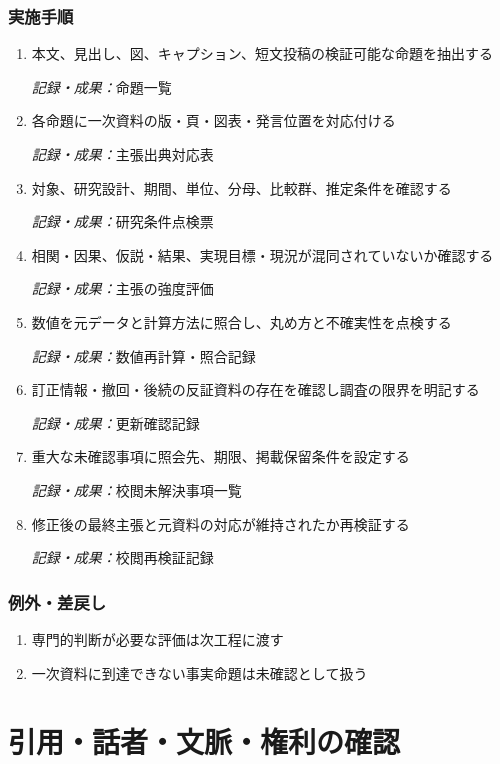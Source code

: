 \documentclass[a4paper,11pt]{article}
\begin{document}
\subsubsection*{実施手順}
\begin{enumerate}[leftmargin=2em,itemsep=0.65em]
\item 本文、見出し、図、キャプション、短文投稿の検証可能な命題を抽出する\par\noindent\textit{記録・成果：}命題一覧\nobreak\smallskip
\item 各命題に一次資料の版・頁・図表・発言位置を対応付ける\par\noindent\textit{記録・成果：}主張出典対応表\nobreak\smallskip
\item 対象、研究設計、期間、単位、分母、比較群、推定条件を確認する\par\noindent\textit{記録・成果：}研究条件点検票\nobreak\smallskip
\item 相関・因果、仮説・結果、実現目標・現況が混同されていないか確認する\par\noindent\textit{記録・成果：}主張の強度評価\nobreak\smallskip
\item 数値を元データと計算方法に照合し、丸め方と不確実性を点検する\par\noindent\textit{記録・成果：}数値再計算・照合記録\nobreak\smallskip
\item 訂正情報・撤回・後続の反証資料の存在を確認し調査の限界を明記する\par\noindent\textit{記録・成果：}更新確認記録\nobreak\smallskip
\item 重大な未確認事項に照会先、期限、掲載保留条件を設定する\par\noindent\textit{記録・成果：}校閲未解決事項一覧\nobreak\smallskip
\item 修正後の最終主張と元資料の対応が維持されたか再検証する\par\noindent\textit{記録・成果：}校閲再検証記録\nobreak\smallskip
\end{enumerate}
\subsubsection*{例外・差戻し}
\begin{enumerate}[leftmargin=2em,itemsep=0.35em]
\item 専門的判断が必要な評価は次工程に渡す
\item 一次資料に到達できない事実命題は未確認として扱う
\end{enumerate}
\section{引用・話者・文脈・権利の確認}
\end{document}
